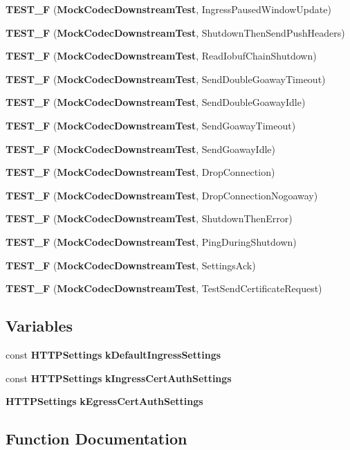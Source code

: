 \begin{DoxyCompactItemize}
\item 
{\bf T\+E\+S\+T\+\_\+F} ({\bf Mock\+Codec\+Downstream\+Test}, Ingress\+Paused\+Window\+Update)
\item 
{\bf T\+E\+S\+T\+\_\+F} ({\bf Mock\+Codec\+Downstream\+Test}, Shutdown\+Then\+Send\+Push\+Headers)
\item 
{\bf T\+E\+S\+T\+\_\+F} ({\bf Mock\+Codec\+Downstream\+Test}, Read\+Iobuf\+Chain\+Shutdown)
\item 
{\bf T\+E\+S\+T\+\_\+F} ({\bf Mock\+Codec\+Downstream\+Test}, Send\+Double\+Goaway\+Timeout)
\item 
{\bf T\+E\+S\+T\+\_\+F} ({\bf Mock\+Codec\+Downstream\+Test}, Send\+Double\+Goaway\+Idle)
\item 
{\bf T\+E\+S\+T\+\_\+F} ({\bf Mock\+Codec\+Downstream\+Test}, Send\+Goaway\+Timeout)
\item 
{\bf T\+E\+S\+T\+\_\+F} ({\bf Mock\+Codec\+Downstream\+Test}, Send\+Goaway\+Idle)
\item 
{\bf T\+E\+S\+T\+\_\+F} ({\bf Mock\+Codec\+Downstream\+Test}, Drop\+Connection)
\item 
{\bf T\+E\+S\+T\+\_\+F} ({\bf Mock\+Codec\+Downstream\+Test}, Drop\+Connection\+Nogoaway)
\item 
{\bf T\+E\+S\+T\+\_\+F} ({\bf Mock\+Codec\+Downstream\+Test}, Shutdown\+Then\+Error)
\item 
{\bf T\+E\+S\+T\+\_\+F} ({\bf Mock\+Codec\+Downstream\+Test}, Ping\+During\+Shutdown)
\item 
{\bf T\+E\+S\+T\+\_\+F} ({\bf Mock\+Codec\+Downstream\+Test}, Settings\+Ack)
\item 
{\bf T\+E\+S\+T\+\_\+F} ({\bf Mock\+Codec\+Downstream\+Test}, Test\+Send\+Certificate\+Request)
\end{DoxyCompactItemize}
\subsection*{Variables}
\begin{DoxyCompactItemize}
\item 
const {\bf H\+T\+T\+P\+Settings} {\bf k\+Default\+Ingress\+Settings}
\item 
const {\bf H\+T\+T\+P\+Settings} {\bf k\+Ingress\+Cert\+Auth\+Settings}
\item 
{\bf H\+T\+T\+P\+Settings} {\bf k\+Egress\+Cert\+Auth\+Settings}
\end{DoxyCompactItemize}


\subsection{Function Documentation}
